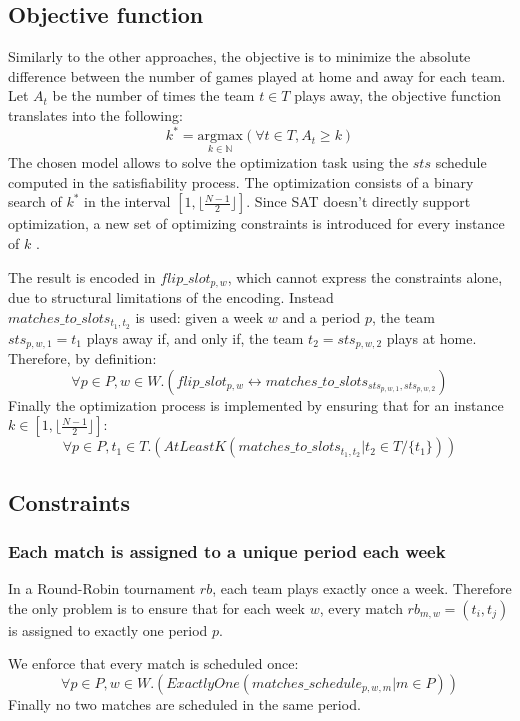 \subsection{Objective function}
Similarly to the other approaches, the objective is to minimize the absolute difference between the number of games played at home and away for each team.
Let $A_t$ be the number of times the team $t \in T$ plays away, the objective function translates into the following:
$$
k^* = \underset{k \in \mathbb{N}}{\text{argmax}} \left( \forall t \in T, A_t \geq k \right)
$$
The chosen model allows to solve the optimization task using the $sts$ schedule computed in the satisfiability process. The optimization consists of a binary search of $k^*$ in the interval $[1, \lfloor\frac{N-1}{2}\rfloor]$. Since SAT doesn't directly support optimization, a new set of optimizing constraints is introduced for every instance of $k$ .

The result is encoded in $flip\_slot_{p, w}$, which cannot express the constraints alone, due to structural limitations of the encoding.
Instead \\$matches\_to\_slots_{t_1, t_2}$ is used: given a week $w$ and a period $p$, the team $sts_{p, w, 1} = t_1$ plays away if, and only if, the team $t_2 = sts_{p, w, 2}$ plays at home. Therefore, by definition:
$$
    \forall p \in P, w \in W.(flip\_slot_{p, w} \leftrightarrow matches\_to\_slots_{sts_{p, w, 1}, sts_{p, w, 2}})
$$
Finally the optimization process is implemented by ensuring that for an instance $k \in [1, \lfloor\frac{N-1}{2}\rfloor]$:
$$
    \forall p \in P, t_1 \in T.(AtLeastK(matches\_to\_slots_{t_1, t_2} | t_2 \in T/\{t_1\}))
$$

\subsection{Constraints}
\subsubsection{Each match is assigned to a unique period each week}
In a Round-Robin tournament $rb$, each team plays exactly once a week. 
Therefore the only problem is to ensure that for each week $w$, every match $rb_{m, w} = (t_i, t_j)$ is assigned to exactly one period $p$.

We enforce that every match is scheduled once:
$$
    \forall p \in P, w \in W.(ExactlyOne(matches\_schedule_{p, w, m} | m \in P))
$$
Finally no two matches are scheduled in the same period. 

